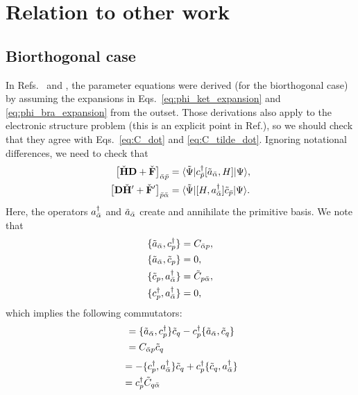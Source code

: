 \documentclass[aip,jcp,preprint,superscriptaddress,nofootinbib]{revtex4-1}
\begin{document}
\section{Relation to other work}
\subsection{Biorthogonal case}
In Refs.~ and ,
the parameter equations were derived (for the biorthogonal case) by assuming the expansions in
Eqs.~\eqref{eq:phi_ket_expansion} and \eqref{eq:phi_bra_expansion} from the outset.
Those derivations also apply to the electronic structure problem
(this is an explicit point in Ref.), so we
should check that they agree with Eqs.~\eqref{eq:C_dot} and \eqref{eq:C_tilde_dot}.
Ignoring notational differences, we need to check that
\begin{align}
    \big[ \check{\mathbf{H}} \mathbf{D} + \check{\mathbf{F}} \big]_{\bar{\alpha} \bar{p}}
    &= \langle \tilde{\Psi} \vert  c^{\dagger}_{\bar{p}} [\tilde{a}_{\bar{\alpha}}, H]  \vert \Psi \rangle,  \label{eq:F_check_correspondence} \\
    \big[ \mathbf{D} \check{\mathbf{H}}' + \check{\mathbf{F}}' \big]_{\bar{p} \bar{\alpha}} 
    &= \langle \tilde{\Psi} \vert  [H, a^{\dagger}_{\bar{\alpha}}] \tilde{c}_{\bar{p}}   \vert \Psi \rangle.  \label{eq:F_check_prime_correspondence}
\end{align}
Here, the operators $a^{\dagger}_{\bar{\alpha}}$ and $\tilde{a}_{\bar{\alpha}}$ create and annihilate
the primitive basis. We note that
\begin{align}
    \{ \tilde{a}_{\bar{\alpha}}, c^{\dagger}_{p} \} &= C_{\bar{\alpha} p}, \\
    \{ \tilde{a}_{\bar{\alpha}}, \tilde{c}_{p} \} &= 0, \\
    \{ \tilde{c}_{p}, a^{\dagger}_{\bar{\alpha}} \} &= \tilde{C}_{p \bar{\alpha}}, \\
    \{ c^{\dagger}_{p}, a^{\dagger}_{\bar{\alpha}} \} &= 0,
\end{align}
which implies the following commutators:
\begin{align}
    [\anniprim{\bar{\alpha}}, \crea{p} \anni{q}] 
    &= \{ \anniprim{\bar{\alpha}}, \crea{p} \} \anni{q} - \crea{p} \{ \anniprim{\bar{\alpha}}, \anni{q} \} \nn
    &= C_{\bar{\alpha} p} \anni{q}
\end{align}
%
\begin{align}
    [\crea{p} \anni{q}, \creaprim{\bar{\alpha}}] 
    &= - \{ \crea{p}, \creaprim{\bar{\alpha}} \} \anni{q} + \crea{p} \{ \anni{q}, \creaprim{\bar{\alpha}} \} \nn
    &= \crea{p} \tilde{C}_{q \bar{\alpha}} 
\end{align}
\end{document}
